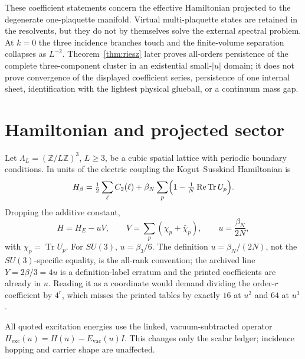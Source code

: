 \documentclass[11pt]{article}
\theoremstyle{plain}
\theoremstyle{definition}
\theoremstyle{remark}
\newcommand{\chk}[1]{}
\begin{document}
These coefficient statements concern the effective Hamiltonian projected to
the degenerate one-plaquette manifold. Virtual multi-plaquette states are
retained in the resolvents, but they do not by themselves solve the external
spectral problem. At $k=0$ the three incidence branches touch and the
finite-volume separation collapses as $L^{-2}$. Theorem~\ref{thm:riesz} later
proves all-orders persistence of the complete three-component cluster in an
existential small-$|u|$ domain; it does not prove convergence of the displayed
coefficient series, persistence of one internal sheet, identification with the
lightest physical glueball, or a continuum mass gap.

\section{Hamiltonian and projected sector}

Let $\Lambda_L=(\mathbb{Z}/L\mathbb{Z})^3$, $L\ge3$, be a cubic spatial
lattice with periodic boundary conditions. In units of the electric coupling
the Kogut--Susskind Hamiltonian is
\begin{equation}
  H_\beta=\tfrac12\sum_\ell C_2(\ell)
  +\beta_N\sum_p\Bigl(1-\tfrac1N\operatorname{Re}\operatorname{Tr}U_p\Bigr).
\end{equation}
Dropping the additive constant,
\begin{equation}\label{eq:H}
  H=H_E-uV,\qquad V=\sum_p(\chi_p+\bar\chi_p),\qquad u=\frac{\beta_N}{2N},
\end{equation}
with $\chi_p=\operatorname{Tr}U_p$. For $SU(3)$, $u=\beta_3/6$. The
definition $u=\beta_N/(2N)$, not the $SU(3)$-specific equality, is the
all-rank convention; the archived line $Y=2\beta/3=4u$ is a definition-label
erratum and the printed coefficients are already in $u$. Reading it as a
coordinate would demand dividing the order-$r$ coefficient by $4^r$, which
misses the printed tables by exactly $16$ at $u^2$ and $64$ at $u^3$.
\chk{the printed towers are canonical-u: 4*Delta(3u/2) reproduces them verbatim}
\chk{the 4**r rescaling breaks the bridge: order 2 off by 16, order 3 by 64}

All quoted excitation energies use the linked, vacuum-subtracted operator
$H_{\mathrm{exc}}(u)=H(u)-E_{\mathrm{vac}}(u)I$. This changes only the scalar
ledger; incidence hopping and carrier shape are unaffected.
\end{document}

